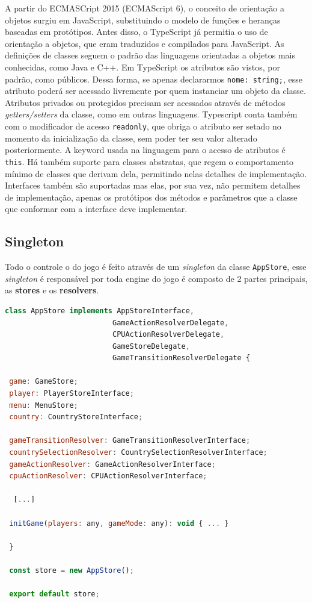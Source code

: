 \documentclass[rel_mlp]{iiufrgs}
\begin{document}
A partir do ECMASCript 2015 (ECMAScript 6), o conceito de orientação a objetos surgiu em JavaScript, substituindo o modelo de funções e heranças baseadas em protótipos. Antes disso, o TypeScript já permitia o uso de orientação a objetos, que eram traduzidos e compilados para JavaScript. As definições de classes seguem o padrão das linguagens orientadas a objetos mais conhecidas, como Java e C++. 
Em TypeScript os atributos são vistos, por padrão, como públicos. Dessa forma, se apenas declararmos \verb|nome: string;|, esse atributo poderá ser acessado livremente por quem instanciar um objeto da classe. Atributos privados ou protegidos precisam ser acessados através de métodos \textit{getters/setters} da classe, como em outras linguagens. Typescript conta também com o modificador de acesso \verb|readonly|, que obriga o atributo ser setado no momento da inicialização da classe, sem poder ter seu valor alterado posteriormente. A keyword usada na linguagem para o acesso de atributos é \verb|this|.
Há também suporte para classes abstratas, que regem o comportamento mínimo de classes que derivam dela, permitindo nelas detalhes de implementação. Interfaces também são suportadas mas elas, por sua vez, não permitem detalhes de implementação, apenas os protótipos dos métodos e parâmetros que a classe que conformar com a interface deve implementar.

\subsection{Singleton}

Todo o controle o do jogo é feito através de um \textit{singleton} da classe \verb|AppStore|, esse \textit{singleton} é responsável por toda engine do jogo é composto de 2 partes principais,
as \textbf{stores} e os \textbf{resolvers}.


\begin{lstlisting}[language=JavaScript]
 class AppStore implements AppStoreInterface,
                         GameActionResolverDelegate,
                         CPUActionResolverDelegate,
                         GameStoreDelegate,
                         GameTransitionResolverDelegate {

 game: GameStore;
 player: PlayerStoreInterface;
 menu: MenuStore;
 country: CountryStoreInterface;

 gameTransitionResolver: GameTransitionResolverInterface;
 countrySelectionResolver: CountrySelectionResolverInterface;
 gameActionResolver: GameActionResolverInterface;
 cpuActionResolver: CPUActionResolverInterface;

  [...]

 initGame(players: any, gameMode: any): void { ... }

 }

 const store = new AppStore();

 export default store;
 \end{lstlisting}
\end{document}

